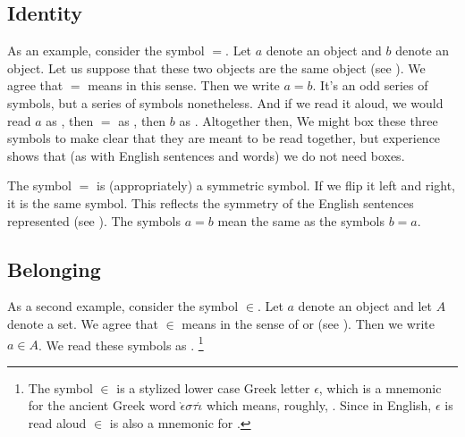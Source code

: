 \subsection*{Identity}

As an example, consider the symbol $=$.
Let $a$ denote an object and $b$ denote an object.
Let us suppose that these two objects are the same object (see ).
We agree that $=$ means  in this sense.
Then we write $a = b$.
It's an odd series of symbols, but a series of symbols nonetheless.
And if we read it aloud, we would read $a$ as , then $=$ as , then $b$ as .
Altogether then, 
We might box these three symbols  to make clear that they are meant to be read together, but experience shows that (as with English sentences and words) we do not need boxes.

The symbol $=$ is (appropriately) a symmetric symbol.
If we flip it left and right, it is the same symbol.
This reflects the symmetry of the English sentences represented (see ).
The symbols $a = b$ mean the same as the symbols $b = a$.



\subsection*{Belonging}

As a second example, consider the symbol $\in$.
Let $a$ denote an object and let $A$ denote a set.
We agree that $\in$ means  in the sense of  or  (see ).
Then we write $a \in A$.
We read these symbols as .
  \ifhmode\unskip\fi\footnote{
The symbol $\in$ is a stylized lower case Greek letter $\epsilon $, which is a mnemonic for the ancient Greek word $\grave{\epsilon } \sigma  \tau  \acute{\iota }$ which means, roughly, .
Since in English, $\epsilon $ is read aloud  $\in$ is also a mnemonic for .
  }

